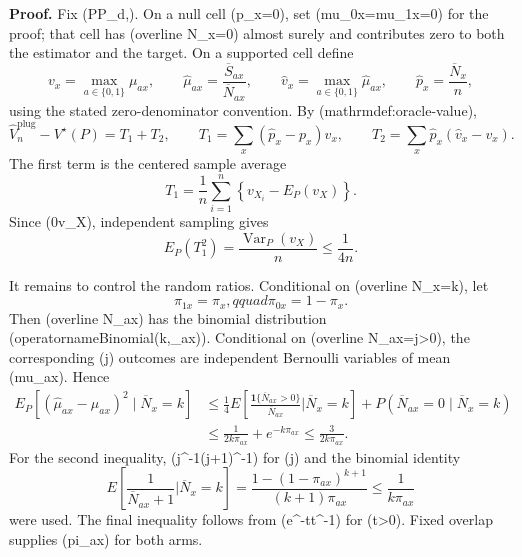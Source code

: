 \textbf{Proof.}
Fix (P\in\mathcal P_{d,\epsilon}).  On a null cell (p_x=0), set (mu_{0x}=mu_{1x}=0) for the proof; that cell has (overline N_x=0) almost surely and contributes zero to both the estimator and the target.  On a supported cell define
\[
 v_x=\max_{a\in\{0,1\}}\mu_{ax},\qquad
 \widehat\mu_{ax}=\frac{\overline S_{ax}}{\overline N_{ax}},\qquad
 \widehat v_x=\max_{a\in\{0,1\}}\widehat\mu_{ax},\qquad
 \widehat p_x=\frac{\overline N_x}{n},
\]
using the stated zero-denominator convention.  By (mathrm{def:oracle-value}),
\[
 \widehat V_n^{\mathrm{plug}}-V^\star(P)
 =T_1+T_2,
 \qquad
 T_1=\sum_x(\widehat p_x-p_x)v_x,
 \qquad
 T_2=\sum_x\widehat p_x(\widehat v_x-v_x).
\]
The first term is the centered sample average
\[
 T_1=\frac1n\sum_{i=1}^n
 \left\{v_{X_i}-E_P(v_X)\right\}.
\]
Since (0\leq v_X), independent sampling gives
\[
 E_P(T_1^2)=\frac{\operatorname{Var}_P(v_X)}n\leq\frac1{4n}.
\]

It remains to control the random ratios.  Conditional on (overline N_x=k), let
\[
 \pi_{1x}=\pi_x,qquad \pi_{0x}=1-\pi_x.
\]
Then (overline N_{ax}) has the binomial distribution (operatorname{Binomial}(k,\pi_{ax})).  Conditional on (overline N_{ax}=j>0), the corresponding (j) outcomes are independent Bernoulli variables of mean (mu_{ax}).  Hence
\[
 \begin{aligned}
 E_P\!\left[(\widehat\mu_{ax}-\mu_{ax})^2
       \mid \overline N_x=k\right]
 &\leq \frac14E\!\left[
       \frac{\mathbf 1\{\overline N_{ax}>0\}}{\overline N_{ax}}
       \mathrel{\Big|}\overline N_x=k\right]
       +P(\overline N_{ax}=0\mid\overline N_x=k)\\
 &\leq \frac1{2k\pi_{ax}}+e^{-k\pi_{ax}}
 \leq \frac{3}{2k\pi_{ax}}.
 \end{aligned}
\]
For the second inequality, (j^{-1}(j+1)^{-1}) for (j) and the binomial identity
\[
 E\!\left[\frac1{\overline N_{ax}+1}\mathrel{\Big|}\overline N_x=k\right]
 =\frac{1-(1-\pi_{ax})^{k+1}}{(k+1)\pi_{ax}}
 \leq\frac1{k\pi_{ax}}
\]
were used.  The final inequality follows from (e^{-t}\leq t^{-1}) for (t>0).  Fixed overlap supplies (pi_{ax}\geq\epsilon) for both arms.

